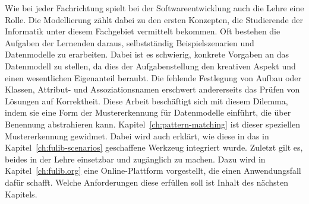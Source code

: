 Wie bei jeder Fachrichtung spielt bei der Softwareentwicklung auch die Lehre eine Rolle.
Die Modellierung zählt dabei zu den ersten Konzepten, die Studierende der Informatik unter diesem Fachgebiet vermittelt bekommen.
Oft bestehen die Aufgaben der Lernenden daraus, selbstständig Beispielszenarien und Datenmodelle zu erarbeiten.
Dabei ist es schwierig, konkrete Vorgaben an das Datenmodell zu stellen, da dies der Aufgabenstellung den kreativen Aspekt und einen wesentlichen Eigenanteil beraubt.
Die fehlende Festlegung von Aufbau oder Klassen, Attribut- und Assoziationsnamen erschwert andererseits das Prüfen von Lösungen auf Korrektheit.
Diese Arbeit beschäftigt sich mit diesem Dilemma, indem sie eine Form der Mustererkennung für Datenmodelle einführt, die über Benennung abstrahieren kann.
Kapitel~\ref{ch:pattern-matching} ist dieser speziellen Mustererkennung gewidmet.
Dabei wird auch erklärt, wie diese in das in Kapitel~\ref{ch:fulib-scenarios} geschaffene Werkzeug integriert wurde.
Zuletzt gilt es, beides in der Lehre einsetzbar und zugänglich zu machen.
Dazu wird in Kapitel~\ref{ch:fulib.org} eine Online-Plattform vorgestellt, die einen Anwendungsfall dafür schafft.
Welche Anforderungen diese erfüllen soll ist Inhalt des nächsten Kapitels.
